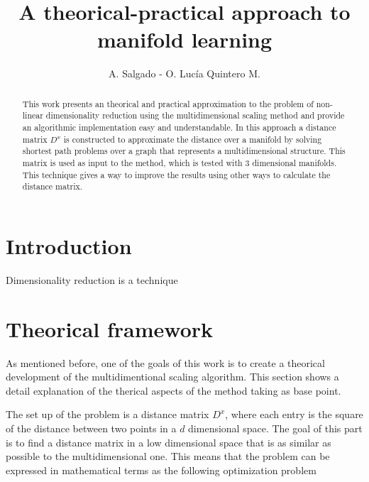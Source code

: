 \documentclass[12pt,journal]{IEEEtran}
\begin{document}
\title{A theorical-practical approach to manifold learning}
\author{A. Salgado - O. Lucía Quintero M.}
\maketitle

\begin{abstract}
    This work presents an theorical and practical approximation to the problem
    of non-linear dimensionality reduction using the multidimensional scaling
    method and provide an algorithmic implementation easy and understandable. In
    this approach a distance matrix $D^x$ is constructed to approximate the
    distance over a manifold by solving shortest path problems over a graph that
    represents a multidimensional structure. This matrix is used as input to the
    method, which is tested with 3 dimensional manifolds. This technique gives a
    way to improve the results using other ways to calculate the distance matrix.
\end{abstract}

\section{Introduction}

Dimensionality reduction is a technique

\cite{manifold}

\cite{dimension}

\cite{mds}

\section{Theorical framework}

    As mentioned before, one of the goals of this work is to create a theorical
    development of the multidimentional scaling algorithm. This section shows a
    detail explanation of the therical aspects of the method taking \cite{proof}
    as base point.

    \vspace{0.5cm}

    The set up of the problem is a distance matrix $D^x$, where each
    entry is the square of the distance between two points in a $d$ dimensional
    space. The goal of this part is to find a distance matrix in a low
    dimensional space that is as similar as possible to the multidimensional one.
    This means that the problem can be expressed in mathematical terms as the
    following optimization problem
\end{document}
